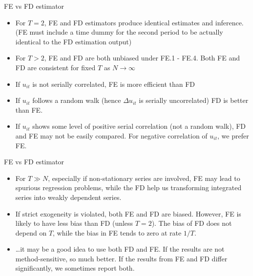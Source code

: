 \documentclass[usenames,dvipsnames]{beamer}
\begin{document}
\begin{frame}{FE vs FD estimator}
\begin{itemize}
\item For $T=2$, FE and FD estimators produce identical estimates and inference. (FE must include a time dummy for the second period to be actually identical to the FD estimation output)
\item For $T>2$, FE and FD are both unbiased under FE.1 - FE.4. Both FE and FD are consistent for fixed $T$ as $N \rightarrow \infty$
\item If $u_{it}$ is not serially correlated, FE is more efficient than FD
\item If $u_{it}$ follows a random walk (hence $\Delta u_{it}$ is serially uncorrelated) FD is better than FE.
\item If $u_{it}$ shows some level of positive serial correlation (not a random walk), FD and FE may not be easily compared. For negative correlation of $u_{it}$, we prefer FE.
\end{itemize}
\end{frame}
\begin{frame}{FE vs FD estimator}
\begin{itemize}
\item For $T \gg N$, especially if non-stationary series are involved, FE may lead to spurious regression problems, while the FD help us transforming integrated series into weakly dependent series.
\item If strict exogeneity is violated, both FE and FD are biased. However, FE is likely to have less bias than FD (unless $T=2$). The bias of FD does not depend on $T$, while the bias in FE tends to zero at rate $1/T$.
\item \dots it may be a good idea to use both FD and FE. If the results are not method-sensitive, so much better. If the results from FE and FD differ significantly, we sometimes report both.
\end{itemize}
\end{frame}
\end{document}
